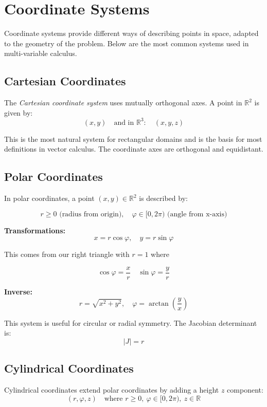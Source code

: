 \newpage
\section{Coordinate Systems}

Coordinate systems provide different ways of describing points in space, adapted to the geometry of the problem. Below are the most 
common systems used in multi-variable calculus.

\subsection{Cartesian Coordinates}

The \emph{Cartesian coordinate system} uses mutually orthogonal axes. A point in \( \mathbb{R}^2 \) is given by:
\[
(x, y)
\quad \text{and in } \mathbb{R}^3: \quad (x, y, z)
\]

This is the most natural system for rectangular domains and is the basis for most definitions in vector calculus. The coordinate axes are orthogonal and equidistant.


\subsection{Polar Coordinates}

In polar coordinates, a point \( (x, y) \in \mathbb{R}^2 \) is described by:

\[
r \ge 0 \text{ (radius from origin)}, \quad \varphi \in [0, 2\pi) \text{ (angle from x-axis)}
\]

\textbf{Transformations:}
\[
x = r \cos \varphi, \quad y = r \sin \varphi
\]

This comes from our right triangle with \(r = 1\) where

\[
    \cos \varphi = \frac{x}{r} \quad \sin \varphi = \frac{y}{r}
\]

\textbf{Inverse:}
\[
r = \sqrt{x^2 + y^2}, \quad \varphi = \arctan\left(\frac{y}{x}\right)
\]

This system is useful for circular or radial symmetry. The Jacobian determinant is:
\[
|J| = r
\]

\subsection{Cylindrical Coordinates}

Cylindrical coordinates extend polar coordinates by adding a height \( z \) component:
\[
(r, \varphi, z) \quad \text{where } r \ge 0, \ \varphi \in [0, 2\pi), \ z \in \mathbb{R}
\]

